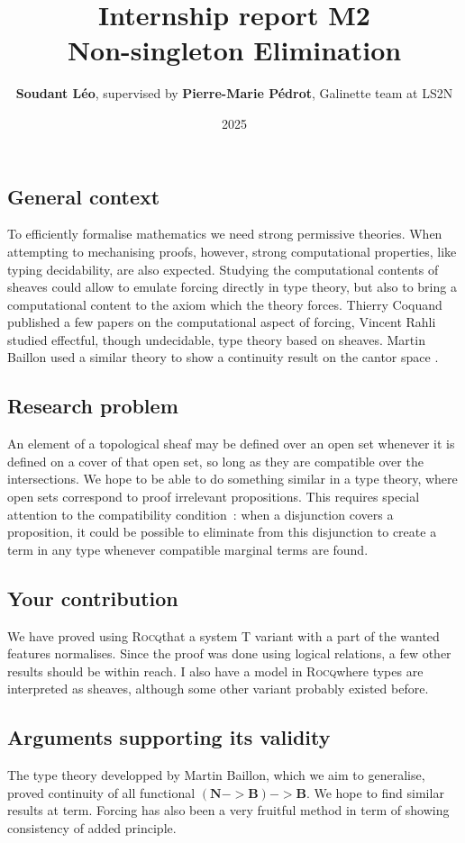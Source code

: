\documentclass[11pt]{article}
\title{Internship report M2\\  Non-singleton Elimination\\}
\author{\textbf{Soudant L\'eo}, supervised by \textbf{Pierre-Marie P\'edrot}, Galinette team at LS2N}
\date{2025}
\newcommand{\0}{\mathbf{0}}
\newcommand{\1}{\mathbf{1}}
\newcommand{\nat}{\mathbf{N}}
\newcommand{\bool}{\mathbf{B}}
\newcommand{\rocq}{\textsc{Rocq}}
\begin{document}
\maketitle
\newpage


\subsection*{General context}
To efficiently formalise mathematics we need strong permissive theories.
When attempting to mechanising proofs, however, strong computational properties, like typing decidability, are also expected.
Studying the computational contents of sheaves could allow to emulate forcing directly in type theory, but also to bring a computational content to the axiom which the theory forces.
Thierry Coquand published a few papers on the computational aspect of forcing, Vincent Rahli studied effectful, though undecidable, type theory based on sheaves.
Martin Baillon used a similar theory to show a continuity result on the cantor space \cite{baillon:tel-04617881}.
\subsection*{Research problem}
An element of a topological sheaf may be defined over an open set whenever it is defined on a cover of that open set, so long as they are compatible over the intersections.
We hope to be able to do something similar in a type theory, where open sets correspond to proof irrelevant propositions.
This requires special attention to the compatibility condition~: when a disjunction covers a proposition, it could be possible to eliminate from this disjunction to create a term in any type whenever compatible marginal terms are found.
\subsection*{Your contribution}
We have proved using \rocq that a system T variant with a part of the wanted features normalises. Since the proof was done using logical relations, a few other results should be within reach. I also have a model in \rocq where types are interpreted as sheaves, although some other variant probably existed before.
\subsection*{Arguments supporting its validity}
The type theory developped by Martin Baillon, which we aim to generalise, proved continuity of all functional $(\nat -> \bool) -> \bool$.
We hope to find similar results at term.
Forcing has also been a very fruitful method in term of showing consistency of added principle.
\end{document}
